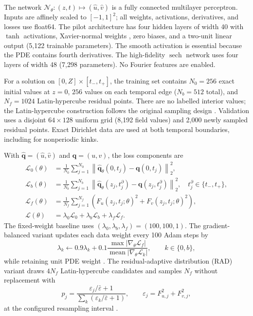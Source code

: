 \documentclass[11pt]{article}
\newcommand{\sech}{\operatorname{sech}}
\begin{document}
The network $\mathcal{N}_{\theta}:(z,t)\mapsto(\hat u,\hat v)$ is a fully
connected multilayer perceptron.  Inputs are affinely scaled to $[-1,1]^2$;
all weights, activations, derivatives, and losses use float64.  The pilot
architecture has four hidden layers of width 40 with $\tanh$ activations,
Xavier-normal weights \citep{glorot2010}, zero biases, and a two-unit linear
output (5,122
trainable parameters).  The smooth activation is essential because the PDE
contains fourth derivatives.  The high-fidelity $\sech$ network uses four
layers of width 48 (7,298 parameters).  No Fourier features are enabled.

For a solution on $[0,Z]\times[t_-,t_+]$, the training set contains
$N_0=256$ exact initial values at $z=0$, $256$ values on each temporal edge
($N_b=512$ total), and $N_f=1024$ Latin-hypercube residual points.  There are
no labelled interior values; the Latin-hypercube construction follows
the original sampling design \citep{mckay1979}.  Validation uses a disjoint $64\times128$ uniform
grid (8,192 field values) and 2,000 newly sampled residual points.  Exact
Dirichlet data are used at both temporal boundaries, including for nonperiodic
kinks.

With $\widehat{\boldsymbol{q}}=(\hat u,\hat v)$ and
$\boldsymbol{q}=(u,v)$, the loss components are
\begin{align}
\mathcal{L}_{0}(\theta)
&=\frac{1}{N_0}\sum_{j=1}^{N_0}
\left\|\widehat{\boldsymbol{q}}_\theta(0,t_j)
-\boldsymbol{q}(0,t_j)\right\|_2^2,
\label{eq:lic}\\
\mathcal{L}_{b}(\theta)
&=\frac{1}{N_b}\sum_{j=1}^{N_b}
\left\|\widehat{\boldsymbol{q}}_\theta(z_j,t_j^{\partial})
-\boldsymbol{q}(z_j,t_j^{\partial})\right\|_2^2,
\quad t_j^{\partial}\in\{t_-,t_+\},
\label{eq:lbc}\\
\mathcal{L}_{f}(\theta)
&=\frac{1}{N_f}\sum_{j=1}^{N_f}
\left(F_u(z_j,t_j;\theta)^2+F_v(z_j,t_j;\theta)^2\right),
\label{eq:lpde}\\
\mathcal{L}(\theta)
&=\lambda_0\mathcal{L}_0+\lambda_b\mathcal{L}_b
+\lambda_f\mathcal{L}_f.
\label{eq:ltotal}
\end{align}
The fixed-weight baseline uses $(\lambda_0,\lambda_b,\lambda_f)=(100,100,1)$.
The gradient-balanced variant updates each data weight every 100 Adam steps by
\begin{equation}
\lambda_k\leftarrow0.9\lambda_k+0.1
\frac{\max|\nabla_\theta\mathcal{L}_f|}
{\operatorname{mean}|\nabla_\theta\mathcal{L}_k|},
\qquad k\in\{0,b\},
\label{eq:gradnorm}
\end{equation}
while retaining unit PDE weight \citep{wang2021}.  The residual-adaptive
distribution (RAD) variant draws $4N_f$ Latin-hypercube candidates and samples
$N_f$ without replacement with
\begin{equation}
p_j=\frac{\varepsilon_j/\bar\varepsilon+1}
{\sum_k(\varepsilon_k/\bar\varepsilon+1)},\qquad
\varepsilon_j=F_{u,j}^2+F_{v,j}^2,
\label{eq:rad}
\end{equation}
at the configured resampling interval \citep{wu2023}.
\end{document}
